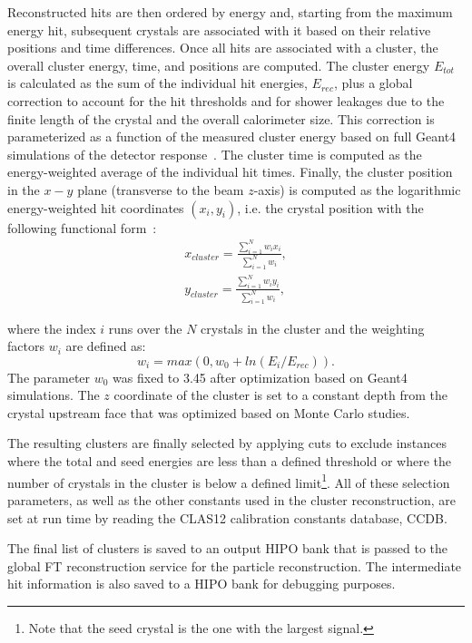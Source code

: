 Reconstructed hits are then ordered by energy and, starting from the maximum energy hit, subsequent crystals
are associated with it based on their relative positions and time differences. Once all hits are associated with a
cluster, the overall cluster energy, time, and positions are computed. The cluster energy $E_{tot}$ is calculated as
the sum of the individual hit energies, $E_{rec}$, plus a global correction to account for the hit thresholds and for
shower leakages due to the finite length of the crystal and the overall calorimeter size. This correction is
parameterized as a function of the measured cluster energy based on full Geant4 simulations of the detector
response~\cite{ft-nim}. The cluster time is computed as the energy-weighted average of the individual hit times.
Finally, the cluster position in the $x-y$ plane (transverse to the beam $z$-axis) is computed as the logarithmic
energy-weighted hit coordinates $(x_i,y_i)$, i.e. the crystal position with the following functional form~\cite{ic}:
\begin{eqnarray}
x_{cluster} = \frac{\sum_{i=1}^N w_i x_i}{\sum_{i=1}^N w_i},\\
y_{cluster} = \frac{\sum_{i=1}^N w_i y_i}{\sum_{i=1}^N w_i},\nonumber
\end{eqnarray}

\noindent
where the index $i$ runs over the $N$ crystals in the cluster and the weighting factors $w_i$ are defined as:
\begin{equation}
w_i=max\left(0,w_0+ln(E_i/E_{rec}) \right).
\end{equation}
\noindent
The parameter $w_0$ was fixed to 3.45 after optimization based on Geant4 simulations. The $z$ coordinate of
the cluster is set to a constant depth from the crystal upstream face that was optimized based on Monte Carlo
studies.

The resulting clusters are finally selected by applying cuts to exclude instances where the total and seed energies
are less than a defined threshold or where the number of crystals in the cluster is below a defined
limit\footnote{Note that the seed crystal is the one with the largest signal.}. All of these selection parameters, as
well as the other constants used in the cluster reconstruction, are set at run time by reading the CLAS12 calibration
constants database, CCDB.

The final list of clusters is saved to an output HIPO bank that is passed to the global FT reconstruction service for
the particle reconstruction. The intermediate hit information is also saved to a HIPO bank for debugging purposes.

